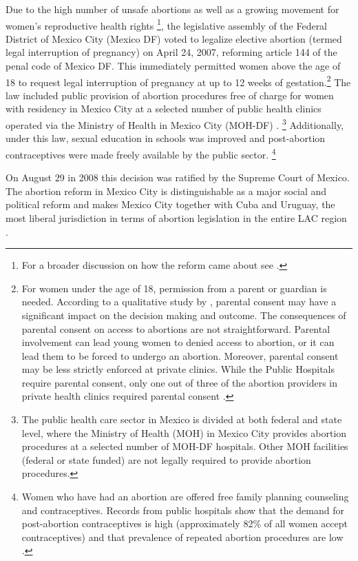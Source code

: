 \documentclass[a4paper, 11pt]{article}
\begin{document}
\begin{spacing}{2}
Due to the high number of unsafe abortions as well as a growing movement for women's reproductive health rights \footnote{For a broader discussion on how the reform came about see \cite{Kulczycki2011}.}, the legislative assembly of the Federal District of Mexico City (Mexico DF) voted to legalize elective abortion (termed legal interruption of pregnancy) on April 24, 2007, reforming article 144 of the penal code of Mexico DF. This immediately permitted women above the age of 18 to request legal interruption of pregnancy at up to 12 weeks of gestation.\footnote{For women under the age of 18, permission from a parent or guardian is needed. According to a qualitative study by \cite{tatum2012decisionmaking}, parental consent may have a significant impact on the decision making and outcome. The consequences of parental consent on access to abortions are not straightforward. Parental involvement can lead young women to denied access to abortion, or it can lead them to be forced to undergo an abortion. Moreover, parental consent may be less strictly enforced at private clinics. While the Public Hospitals require parental consent, only one out of three of the abortion providers in private health clinics required parental consent \citep{Schiavonetal2010}.} The law included public provision of abortion procedures free of charge for women with residency in Mexico City at a selected number of public health clinics operated via the Ministry of Health in Mexico City (MOH-DF) \citep{Contreras2011}.
\footnote{The public health care sector in Mexico is divided at both federal and state level, where the Ministry of Health (MOH) in Mexico City provides abortion procedures at a selected number of MOH-DF hospitals. Other MOH facilities (federal or state funded) are not legally required to provide abortion procedures.} Additionally, under this law, sexual education in schools was improved and post-abortion contraceptives were made freely available by the public sector.
\footnote{Women who have had an abortion are offered free family planning counseling and contraceptives. Records from public hospitals show that the demand for post-abortion contraceptives is high (approximately 82\% of all women accept contraceptives) and that prevalence of repeated abortion procedures are low \citep{Becker}.} 



On August 29 in 2008 this decision was ratified by the Supreme Court of Mexico. The abortion reform in Mexico City is distinguishable as a major social and political reform and makes Mexico City together with Cuba and Uruguay, the most liberal jurisdiction in terms of abortion legislation in the entire LAC region \citep{Fraser}. 



\end{spacing}
\end{document}
